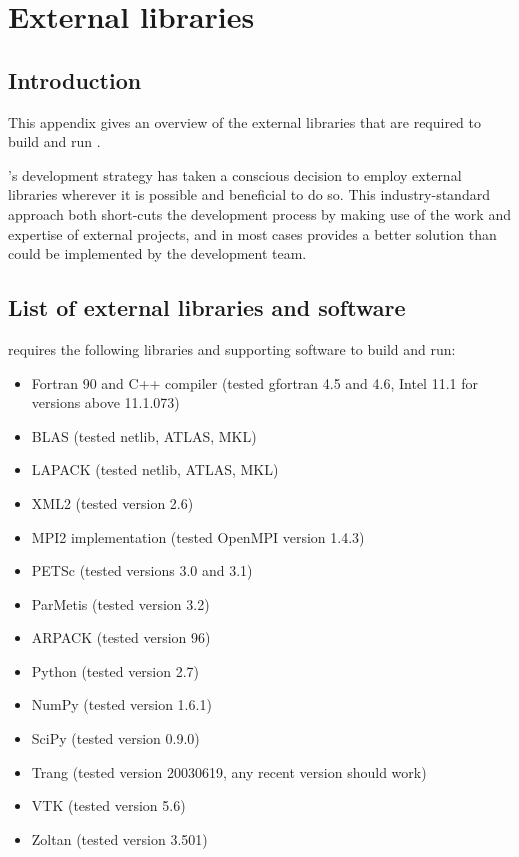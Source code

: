 \chapter{External libraries}\label{chap:external}

\section{Introduction}

This appendix gives an overview of the external libraries that are required to
build and run \fluidity.

\fluidity's development strategy has taken a conscious decision to employ
external libraries wherever it is possible and beneficial to do so. This
industry-standard approach both short-cuts the development process by making
use of the work and expertise of external projects, and in most cases provides
a better solution than could be implemented by the \fluidity development team.

\section{List of external libraries and software}
\label{sec:required_ḻibraries_list}

\fluidity requires the following libraries and supporting software to build and
run:

\begin{itemize}
\item Fortran 90 and C++ compiler (tested gfortran 4.5 and 4.6, Intel 11.1 for versions above 11.1.073)
\item BLAS (tested netlib, ATLAS, MKL)
\item LAPACK (tested netlib, ATLAS, MKL)
\item XML2 (tested version 2.6)
\item MPI2 implementation (tested OpenMPI version 1.4.3)
\item PETSc (tested versions 3.0 and 3.1)
\item ParMetis (tested version 3.2)
\item ARPACK (tested version 96)
\item Python (tested version 2.7) 
\item NumPy (tested version 1.6.1)
\item SciPy (tested version 0.9.0)
\item Trang (tested version 20030619, any recent version should work)
\item VTK (tested version 5.6)
\item Zoltan (tested version 3.501)
\end{itemize}

